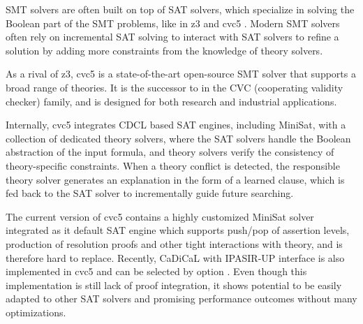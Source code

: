 SMT solvers are often built on top of SAT solvers, which specialize in solving the Boolean part of the SMT problems, like in z3 \cite{10.1007/978-3-540-78800-3_24} and cvc5 \cite{10.1007/978-3-030-99524-9_24}. Modern SMT solvers often rely on incremental SAT solving to interact with SAT solvers to refine a solution by adding more constraints from the knowledge of theory solvers.

As a rival of z3, cvc5 is a state-of-the-art open-source SMT solver that supports a broad range of theories. It is the successor to  in the CVC (cooperating validity checker) family, and is designed for both research and industrial applications.

Internally, cvc5 integrates CDCL based SAT engines, including MiniSat, with a collection of dedicated theory solvers, where the SAT solvers handle the Boolean abstraction of the input formula, and theory solvers verify the consistency of theory-specific constraints. When a theory conflict is detected, the responsible theory solver generates an explanation in the form of a learned clause, which is fed back to the SAT solver to incrementally guide future searching.

The current version of cvc5 contains a highly customized MiniSat solver integrated as it default SAT engine which supports push/pop of assertion levels, production of resolution proofs and other tight interactions with theory, and is therefore hard to replace. Recently, CaDiCaL with IPASIR-UP interface is also implemented in cvc5 and can be selected by option . Even though this implementation is still lack of proof integration, it shows potential to be easily adapted to other SAT solvers and promising performance outcomes without many optimizations.
